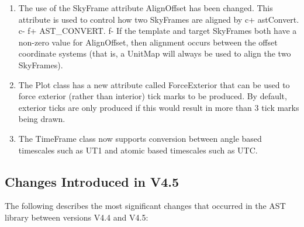\documentclass[twoside,11pt]{article}
\begin{document}
\begin{enumerate}
\item The use of the SkyFrame attribute AlignOffset has been changed. This
attribute is used to control how two SkyFrames are aligned by
c+
astConvert.
c-
f+
AST\_CONVERT.
f-
If the template and target SkyFrames both have a non-zero value for
AlignOffset, then alignment occurs between the offset coordinate systems
(that is, a UnitMap will always be used to align the two SkyFrames).

\item The Plot class has a new attribute called ForceExterior that can be
used to force exterior (rather than interior) tick marks to be produced.
By default, exterior ticks are only produced if this would result in
more than 3 tick marks being drawn.

\item The TimeFrame class now supports conversion between angle based
timescales such as UT1 and atomic based timescales such as UTC.

\end{enumerate}

\subsection{Changes Introduced in V4.5}

The following describes the most significant changes that
occurred in the AST library between versions V4.4 and V4.5:
\end{document}
